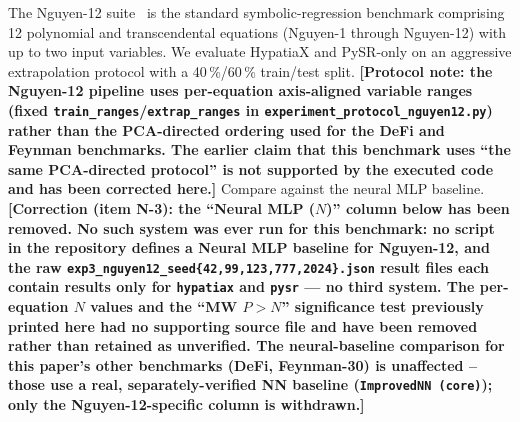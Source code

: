 \documentclass[twoside,11pt]{article}
\begin{document}
The Nguyen-12 suite~\citep{uy2011semantically} is the standard symbolic-regression
benchmark comprising 12 polynomial and transcendental equations (Nguyen-1 through
Nguyen-12) with up to two input variables.  We evaluate HypatiaX and PySR-only on
an aggressive extrapolation protocol with a 40\,\%/60\,\% train/test split.
\textbf{[Protocol note: the Nguyen-12 pipeline uses per-equation axis-aligned
variable ranges (fixed \texttt{train\_ranges}/\texttt{extrap\_ranges} in
\texttt{experiment\_protocol\_nguyen12.py}) rather than the PCA-directed
ordering used for the DeFi and Feynman benchmarks.  The earlier claim that
this benchmark uses ``the same PCA-directed protocol'' is not supported by
the executed code and has been corrected here.]}
Compare against the neural MLP baseline. \textbf{[Correction (item N-3):
the ``Neural MLP ($N$)'' column below has been removed. No such system
was ever run for this benchmark: no script in the repository defines a
Neural MLP baseline for Nguyen-12, and the raw
\texttt{exp3\_nguyen12\_seed\{42,99,123,777,2024\}.json} result files each
contain results only for \texttt{hypatiax} and \texttt{pysr} --- no third
system. The per-equation $N$ values and the ``MW $P{>}N$'' significance
test previously printed here had no supporting source file and have been
removed rather than retained as unverified. The neural-baseline comparison
for this paper's other benchmarks (DeFi, Feynman-30) is unaffected --
those use a real, separately-verified NN baseline
(\texttt{ImprovedNN (core)}); only the Nguyen-12-specific column is
withdrawn.]}
\end{document}
